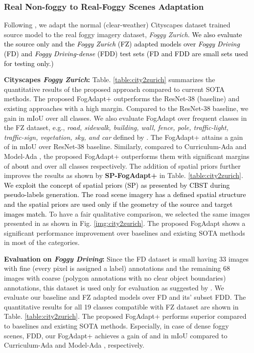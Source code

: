 \documentclass[final,5p,times,twocolumn]{elsarticle}
\begin{document}
\subsubsection{Real Non-foggy to Real-Foggy Scenes Adaptation}
Following \cite{sakaridis2018model, dai2019curriculum}, we adapt the normal (clear-weather) Cityscapes dataset trained source model to the real foggy imagery dataset, \textit{Foggy Zurich}. 
\textcolor{black}{We also evaluate the source only and the \textit{Foggy Zurich} (FZ) adapted models over \textit{Foggy Driving} (FD) and \textit{Foggy Driving-dense } (FDD) test sets (FD and FDD are small sets used for testing only.)} 


\textbf{Cityscapes  \textit{Foggy Zurich}: }
Table. \ref{table:city2zurich} summarizes the quantitative results of the proposed approach compared to current SOTA methods. The proposed FogAdapt+ outperforms the ResNet-38 (baseline) and existing approaches with a high margin. Compared to the ResNet-38 \cite{wu2019Resnet38} baseline, we gain  in mIoU over all classes. We also evaluate FogAdapt over frequent classes in the FZ dataset, e.g., \textit{road, sidewalk, building, wall, fence, pole, traffic-light, traffic-sign, vegetation, sky, and car} defined by \cite{dai2019curriculum}. The FogAdapt+ attains a gain of  in mIoU over ResNet-38 baseline. 
Similarly, compared to Curriculum-Ada \cite{dai2019curriculum} and Model-Ada \cite{sakaridis2018model}, the proposed FogAdapt+ outperforms them with significant margins of \textcolor{black}{about}  and  over all classes respectively. The addition of spatial priors further improves the results as shown by \textbf{SP-FogAdapt+} in Table. \ref{table:city2zurich}. 
\textcolor{black}{We exploit the concept of spatial priors (SP) as presented by CBST \cite{zou2018unsupervised} during pseudo-labels generation. The road scene imagery has a defined spatial structure and the spatial priors are used only if the geometry of the source and target images match. }
To have a fair qualitative comparison, we selected the same images presented in \cite{dai2019curriculum} as shown in Fig. \ref{img:city2zurich}. The proposed FogAdapt shows a significant performance improvement over baselines and existing SOTA methods in most of the categories. 

\textbf{Evaluation on \textit{Foggy Driving}: }
Since the FD dataset is small having 33 images with fine (every pixel is assigned a label)
annotations and the remaining 68 images with coarse (polygon annotations with no clear object boundaries) annotations, this dataset is used only for evaluation as suggested by \cite{sakaridis2018semantic}.  
We evaluate our baseline and FZ adapted models over FD and its' subset FDD. The quantitative results for all 19 classes compatible with FZ dataset are shown in Table. \ref{table:city2zurich}. The proposed FogAdapt+ performs superior compared to baselines and existing SOTA methods. Especially, in case of dense foggy scenes, FDD, our FogAdapt+ achieves a gain of  and  in mIoU compared to Curriculum-Ada \cite{dai2019curriculum} and Model-Ada \cite{sakaridis2018model}, respectively. 
\end{document}
